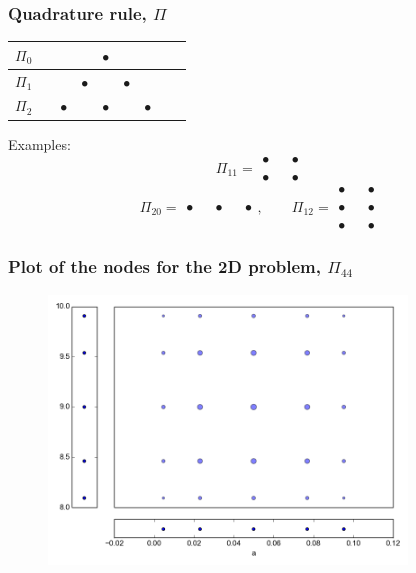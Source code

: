 \documentclass{beamer}
\begin{document}
\begin{frame}
 \frametitle{Quadrature rule, $\Pi$}
 \begin{table}
  \begin{tabular}{lcccccccc}
    $\Pi_0$& &&& $\bullet$& &&&  \\\hline
   $\Pi_1$ &&&$\bullet$& &$\bullet$&&& \\\hline
   $\Pi_2$ &&$\bullet$&&$\bullet$ &&$\bullet$&& \\
   \end{tabular}
\end{table}  
  
 Examples:
  \[\Pi_{11} = \begin{array}{cccc}
                 \bullet & & \bullet\\
                 &&\\
                 \bullet & & \bullet
                 \end{array}
\]
 \[ \Pi_{20} = \begin{array}{ccccc}
           \bullet & & \bullet & & \bullet
          \end{array}, \qquad \Pi_{12} = \begin{array}{cccc}
					\bullet&&\bullet\\\\
					\bullet&&\bullet\\\\
					\bullet&&\bullet
                                        \end{array}
 \]
 \end{frame}



\begin{frame}
 \frametitle{Plot of the nodes for the 2D problem, $\Pi_{44}$}
 \begin{figure}
  \includegraphics[width=0.85\textwidth]{nodes.png}
 \end{figure}
\end{frame}
\end{document}
